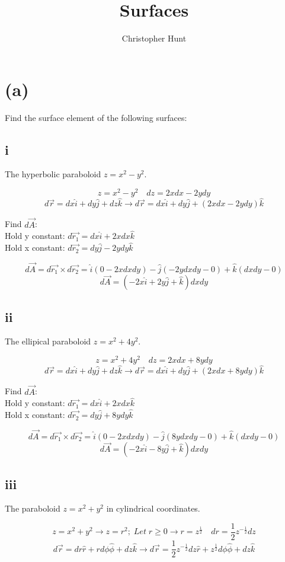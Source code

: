 \documentclass[11pt]{article}
\title{Surfaces}
\author{Christopher Hunt}
\date{}
\begin{document}
\pagestyle{fancy}
\fancyhf{}
\rhead{\thepage}
\maketitle


\section*{(a)}
Find the surface element of the following surfaces:
\subsection*{i}
The hyperbolic paraboloid $z=x^2-y^2$.

$$z = x^2-y^2 \quad dz = 2xdx-2ydy$$
$$d\vec{r} = dx\hat{i}+dy\hat{j}+dz\hat{k} \rightarrow d\vec{r} = dx\hat{i}+dy\hat{j}+(2xdx-2ydy)\hat{k}$$

Find $d\vec{A}$:
\\
Hold y constant:
$d\vec{r_1} = dx\hat{i} +2xdx\hat{k}$
\\
Hold x constant:
$d\vec{r_2} = dy\hat{j}-2ydy\hat{k}$

$$d\vec{A} = d\vec{r_1} \times d\vec{r_2} = \hat{i}(0-2xdxdy) - \hat{j}(-2ydxdy-0)+\hat{k}(dxdy-0)$$
$$d\vec{A} = (-2x\hat{i}+2y\hat{j}+\hat{k})dxdy$$
\subsection*{ii}
The ellipical paraboloid $z=x^2+4y^2$.

$$z = x^2+4y^2 \quad dz = 2xdx+8ydy$$
$$d\vec{r} = dx\hat{i}+dy\hat{j}+dz\hat{k} \rightarrow d\vec{r} = dx\hat{i}+dy\hat{j}+(2xdx+8ydy)\hat{k}$$

Find $d\vec{A}$:
\\
Hold y constant:
$d\vec{r_1} = dx\hat{i} +2xdx\hat{k}$
\\
Hold x constant:
$d\vec{r_2} = dy\hat{j}+8ydy\hat{k}$

$$d\vec{A} = d\vec{r_1} \times d\vec{r_2} = \hat{i}(0-2xdxdy) - \hat{j}(8ydxdy-0)+\hat{k}(dxdy-0)$$
$$d\vec{A} = (-2x\hat{i}-8y\hat{j}+\hat{k})dxdy$$
\subsection*{iii}
The paraboloid $z=x^2+y^2$ in cylindrical coordinates.

$$z = x^2+y^2 \rightarrow z = r^2; \; Let\; r \geq 0 \rightarrow r = z^\frac{1}{2}  \quad dr = \frac{1}{2}z^{-\frac{1}{2}}dz$$
$$d\vec{r} = dr\hat{r}+rd\phi\hat{\phi}+dz\hat{k} \rightarrow d\vec{r} = \frac{1}{2}z^{-\frac{1}{2}}dz\hat{r}+z^\frac{1}{2}d\phi\hat{\phi}+dz\hat{k}$$
\end{document}
